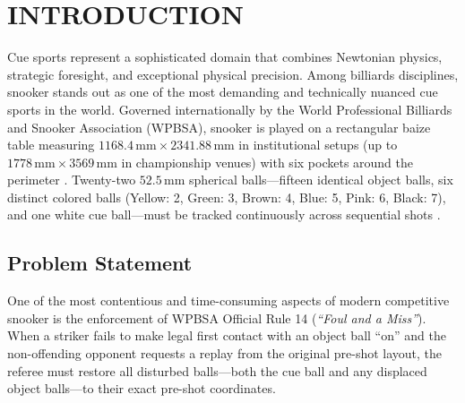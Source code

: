 \chapter{INTRODUCTION}

Cue sports represent a sophisticated domain that combines Newtonian physics, strategic foresight, and exceptional physical precision. Among billiards disciplines, snooker stands out as one of the most demanding and technically nuanced cue sports in the world. Governed internationally by the World Professional Billiards and Snooker Association (WPBSA), snooker is played on a rectangular baize table measuring $1168.4\,\text{mm} \times 2341.88\,\text{mm}$ in institutional setups (up to $1778\,\text{mm} \times 3569\,\text{mm}$ in championship venues) with six pockets around the perimeter \cite{ref27}. Twenty-two $52.5\,\text{mm}$ spherical balls---fifteen identical object balls, six distinct colored balls (Yellow: 2, Green: 3, Brown: 4, Blue: 5, Pink: 6, Black: 7), and one white cue ball---must be tracked continuously across sequential shots \cite{ref4, ref12}.

\section{Problem Statement}
One of the most contentious and time-consuming aspects of modern competitive snooker is the enforcement of WPBSA Official Rule 14 (\textit{``Foul and a Miss''}). When a striker fails to make legal first contact with an object ball ``on'' and the non-offending opponent requests a replay from the original pre-shot layout, the referee must restore all disturbed balls---both the cue ball and any displaced object balls---to their exact pre-shot coordinates.

